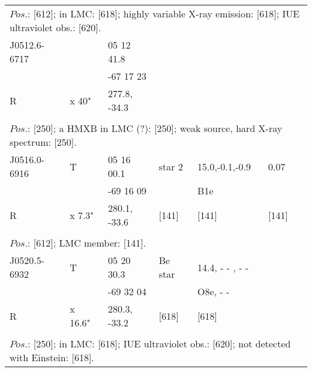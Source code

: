\documentclass{aa}
\begin{document}
\begin{table*}[h]
\begin{tabular}{p{2.5cm}p{1cm}p{1.8cm}p{2.3cm}p{3.3cm}p{2.0cm}p{2.2cm}}
\\
\multicolumn{7}{p{17.5cm}}{
$Pos$.: [612]; in LMC: [618]; highly variable X-ray emission: [618]; IUE ultraviolet obs.: [620].   }\\

\noalign{\smallskip}
\hline
\noalign{\smallskip}
J0512.6-6717   &               &  05 12 41.8   &                 &      &  &  \\            
                           &                & -67 17 23      &                 &      &    &   \\                                            
     R                   &  x 40"    & 277.8, -34.3   &                 &      &      &    \\                                
\\
\multicolumn{7}{p{17.5cm}}{
$Pos$.: [250]; a HMXB in LMC (?): [250]; weak source, hard X-ray spectrum: [250].    }\\

\noalign{\smallskip}
\hline
\noalign{\smallskip}
J0516.0-6916   &  T         &     05 16 00.1  & star 2  &      15.0,-0.1,-0.9        &  0.07    &  \\
                            &             &   -69 16 09      &              &     B1e                         &              &     \\                
   R                      & x 7.3"  & 280.1, -33.6    & [141]    &      [141]                       &  [141]   &        \\
  
\\
\multicolumn{7}{p{17.5cm}}{
$Pos$.: [612]; LMC member: [141].             }\\

\noalign{\smallskip}
\hline
\noalign{\smallskip}
J0520.5-6932   &   T           &  05 20 30.3 &  Be star   & 14.4, - - , - -   &                 &  \\
                            &                & -69 32 04    &                    & O8e, - -         &                 &    \\                                
     R                    & x 16.6"  & 280.3, -33.2 & [618]          &     [618]         &                 &     \\ 
\\
\multicolumn{7}{p{17.5cm}}{
$Pos$.: [250];  in LMC: [618]; IUE ultraviolet obs.: [620]; not detected with Einstein: [618].    }\\


\end{tabular}
\end{table*}
\end{document}
